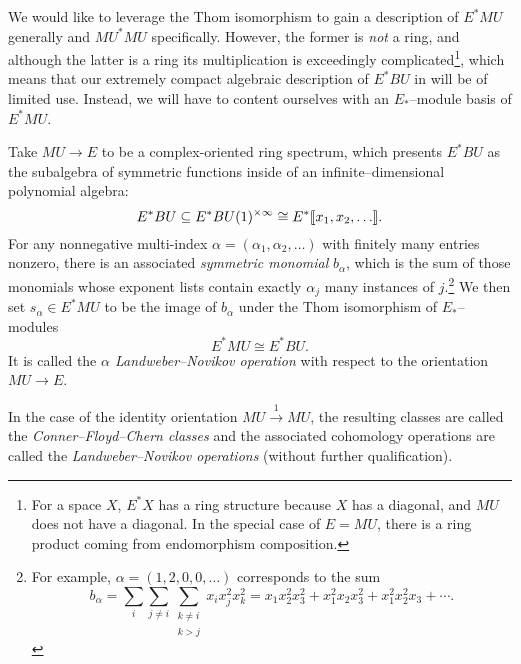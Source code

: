 We would like to leverage the Thom isomorphism to gain a description of \(E^* MU\) generally and \(MU^* MU\) specifically.  However, the former is \emph{not} a ring, and although the latter is a ring its multiplication is exceedingly complicated\footnote{For a space \(X\), \(E^* X\) has a ring structure because \(X\) has a diagonal, and \(MU\) does not have a diagonal.  In the special case of \(E = MU\), there is a ring product coming from endomorphism composition.}, which means that our extremely compact algebraic description of \(E^* BU\) in  will be of limited use.  Instead, we will have to content ourselves with an \(E_*\)--module basis of \(E^* MU\).
\begin{definition}
Take \(MU \to E\) to be a complex-oriented ring spectrum, which presents \(E^* BU\) as the subalgebra of symmetric functions inside of an infinite--dimensional polynomial algebra: \[E^* BU \subseteq E^* BU(1)^{\times \infty} \cong E^*\llbracket{x_1, x_2, \ldots}\rrbracket.\]  For any nonnegative multi-index \(\alpha = (\alpha_1, \alpha_2, \ldots)\) with finitely many entries nonzero, there is an associated \textit{symmetric monomial} \(b_\alpha\), which is the sum of those monomials whose exponent lists contain exactly \(\alpha_j\) many instances of \(j\).\footnote{For example, \(\alpha = (1, 2, 0, 0, \ldots)\) corresponds to the sum \[b_\alpha = \sum_i \sum_{j \ne i} \sum_{\substack{k \ne i \\ k > j}} x_i x_j^2 x_k^2 = x_1 x_2^2 x_3^2 + x_1^2 x_2 x_3^2 + x_1^2 x_2^2 x_3 + \cdots.\]}  We then set \(s_\alpha \in E^* MU\) to be the image of \(b_\alpha\) under the Thom isomorphism of \(E_*\)--modules \[E^* MU \cong E^* BU.\]  It is called the \textit{\(\alpha\){\th} Landweber--Novikov operation} with respect to the orientation \(MU \to E\).
\end{definition}

\begin{definition}
In the case of the identity orientation \(MU \xrightarrow{1} MU\), the resulting classes are called the \textit{Conner--Floyd--Chern classes} and the associated cohomology operations are called the \textit{Landweber--Novikov operations} (without further qualification).
\end{definition}


